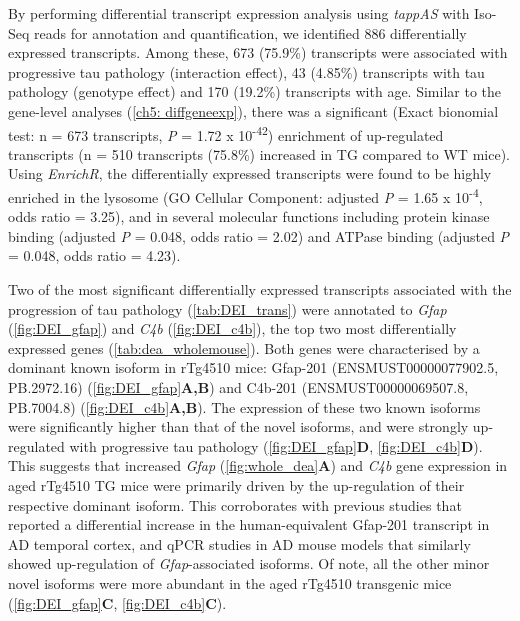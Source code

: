By performing differential transcript expression analysis using \textit{tappAS} with Iso-Seq reads for annotation and quantification, we identified 886 differentially expressed transcripts. Among these, 673 (75.9\%) transcripts were associated with progressive tau pathology (interaction effect), 43 (4.85\%) transcripts with tau pathology (genotype effect) and 170 (19.2\%) transcripts with age. Similar to the gene-level analyses (\cref{ch5: diffgeneexp}), there was a significant (Exact bionomial test: n = 673 transcripts, \textit{P} = 1.72 x 10\textsuperscript{-42}) enrichment of up-regulated transcripts (n = 510 transcripts (75.8\%) increased in TG compared to WT mice). Using \textit{EnrichR}, the differentially expressed transcripts were found to be highly enriched in the lysosome (GO Cellular Component: adjusted \textit{P} = 1.65 x 10\textsuperscript{-4}, odds ratio = 3.25), and in several molecular functions including protein kinase binding (adjusted \textit{P} = 0.048, odds ratio = 2.02) and ATPase binding (adjusted \textit{P} = 0.048, odds ratio = 4.23).  

Two of the most significant differentially expressed transcripts associated with the progression of tau pathology (\cref{tab:DEI_trans}) were annotated to \textit{Gfap} (\cref{fig:DEI_gfap}) and \textit{C4b} (\cref{fig:DEI_c4b}), the top two most differentially expressed genes (\cref{tab:dea_wholemouse}). Both genes were characterised by a dominant known isoform in rTg4510 mice: Gfap-201 (ENSMUST00000077902.5, PB.2972.16) (\cref{fig:DEI_gfap}\textbf{A,B}) and C4b-201 (ENSMUST00000069507.8, PB.7004.8) (\cref{fig:DEI_c4b}\textbf{A,B}). The expression of these two known isoforms were significantly higher than that of the novel isoforms, and were strongly up-regulated with progressive tau pathology (\cref{fig:DEI_gfap}\textbf{D}, \cref{fig:DEI_c4b}\textbf{D}). This suggests that increased \textit{Gfap} (\cref{fig:whole_dea}\textbf{A}) and \textit{C4b} gene expression in aged rTg4510 TG mice were primarily driven by the up-regulation of their respective dominant isoform. This corroborates with previous studies that reported a differential increase in the human-equivalent Gfap-201 transcript in AD temporal cortex\cite{Roelofs2005}, and qPCR studies in AD mouse models that similarly showed up-regulation of \textit{Gfap}-associated isoforms\cite{Kamphuis2012}. Of note, all the other minor novel isoforms were more abundant in the aged rTg4510 transgenic mice (\cref{fig:DEI_gfap}\textbf{C}, \cref{fig:DEI_c4b}\textbf{C}).


